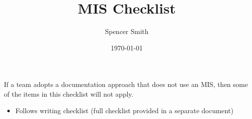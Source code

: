 \documentclass[12pt]{article}
\begin{document}
\title{MIS Checklist}
\author{Spencer Smith}
\date{\today}

\maketitle

If a team adopts a documentation approach that does not use an MIS, then some
of the items in this checklist will not apply.

\begin{itemize}

  \item Follows writing checklist (full checklist provided in a separate document)


\end{itemize}
\end{document}
